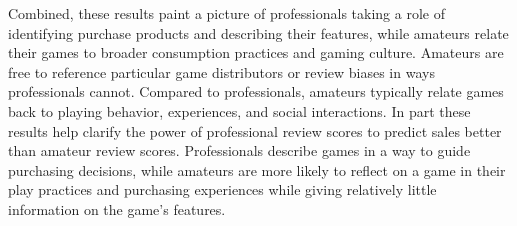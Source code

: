 \documentclass[letterpaper]{article}
\begin{document}

Combined, these results paint a picture of professionals taking a role of identifying purchase products and describing their features, while amateurs relate their games to broader consumption practices and gaming culture. Amateurs are free to reference particular game distributors or review biases in ways professionals cannot. Compared to professionals, amateurs typically relate games back to playing behavior, experiences, and social interactions. In part these results help clarify the power of professional review scores to predict sales better than amateur review scores. Professionals describe games in a way to guide purchasing decisions, while amateurs are more likely to reflect on a game in their play practices and purchasing experiences while giving relatively little information on the game's features.
\end{document}
